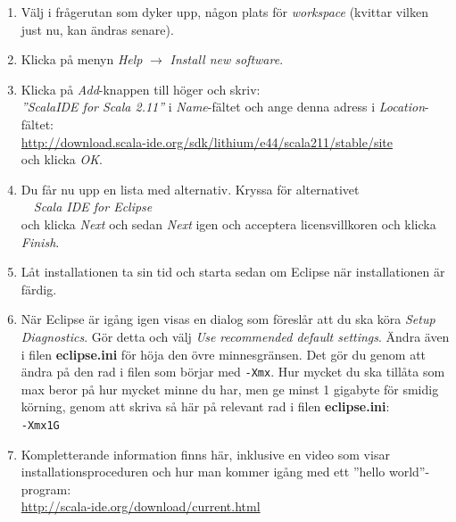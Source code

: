 \begin{enumerate}
\begin{enumerate}
\item Välj i frågerutan som dyker upp, någon plats för \textit{workspace} (kvittar vilken just nu, kan ändras senare).

\item Klicka på menyn \textit{Help} $\rightarrow$ \textit{Install new software}.

\item Klicka på \textit{Add}-knappen till höger och skriv: \\ \textit{''ScalaIDE for Scala 2.11''} i \textit{Name}-fältet och ange denna adress i \textit{Location}-fältet: \\
  {\small\mbox{\url{http://download.scala-ide.org/sdk/lithium/e44/scala211/stable/site}}} \\
  och klicka \textit{OK}.
  
\item Du får nu upp en lista med alternativ. Kryssa för alternativet
\\ {\frame{\checkmark}}~~\textit{Scala IDE for Eclipse} \\ och klicka \textit{Next} och sedan \textit{Next} igen och acceptera licensvillkoren och klicka \textit{Finish}.

\item Låt installationen ta sin tid och starta sedan om Eclipse när installationen är färdig. 

\item När Eclipse är igång igen visas en dialog som föreslår att du ska köra \textit{Setup Diagnostics}. Gör detta och välj \textit{Use recommended default settings}. Ändra även i filen \textbf{eclipse.ini} för höja den övre minnesgränsen. Det gör du genom att ändra på den rad i filen som börjar med \texttt{-Xmx}. Hur mycket du ska tillåta som max beror på hur mycket minne du har, men ge minst 1 gigabyte för smidig körning, genom att skriva så här på relevant rad i filen \textbf{eclipse.ini}: \\
\texttt{-Xmx1G } \\


\item Kompletterande information finns här, inklusive en video som visar installationsproceduren och hur man kommer igång med ett ''hello world''-program: \\ \url{http://scala-ide.org/download/current.html}


\end{enumerate}


\end{enumerate}

